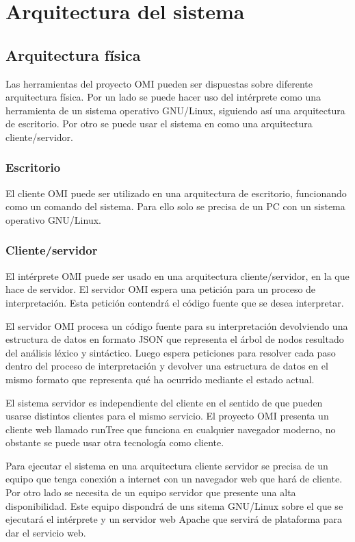 \section{Arquitectura del sistema}
\subsection {Arquitectura física}
Las herramientas del proyecto OMI pueden ser dispuestas sobre diferente arquitectura física. Por un lado se puede hacer uso 
del intérprete como una herramienta de un sistema operativo GNU/Linux, siguiendo así una arquitectura de escritorio. 
Por otro se puede usar el sistema en como una arquitectura cliente/servidor.

\subsubsection{Escritorio}
El cliente OMI puede ser utilizado en una arquitectura de escritorio, funcionando como un comando del sistema. Para ello solo se precisa de un PC con un sistema operativo GNU/Linux.

\subsubsection{Cliente/servidor}
El intérprete OMI puede ser usado en una arquitectura cliente/servidor, en la que hace de servidor. El servidor OMI espera una petición para un proceso de interpretación. Esta petición
contendrá el código fuente que se desea interpretar.

El servidor OMI procesa un código fuente para su interpretación devolviendo una estructura de datos en formato JSON que representa el árbol de nodos resultado del análisis léxico y sintáctico. 
Luego espera peticiones para resolver cada paso dentro del proceso de interpretación y devolver una estructura de datos en el mismo formato que representa qué ha ocurrido mediante el estado actual.

El sistema servidor es independiente del cliente en el sentido de que pueden usarse distintos clientes para el mismo servicio. El proyecto OMI presenta un cliente web llamado runTree 
que funciona en cualquier navegador moderno, no obstante se puede usar otra tecnología como cliente. 

Para ejecutar el sistema en una arquitectura cliente servidor se precisa de un equipo que tenga conexión a internet con un navegador web que hará de cliente. Por otro lado se necesita de un equipo servidor
que presente una alta disponibilidad. Este equipo dispondrá de uns sitema GNU/Linux sobre el que se ejecutará el intérprete y un servidor web Apache que servirá de plataforma para dar el servicio web.

